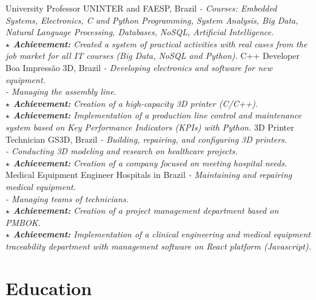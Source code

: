 \documentclass[letterpaper]{twentysecondcv_en} %
\begin{document}
\begin{twenty} %
						{University Professor}
						{UNINTER and FAESP, Brazil}
						{\emph{- Courses: Embedded Systems, Electronics, C and Python 
						Programming, System Analysis, Big Data, 
						Natural Language Processing, Databases, NoSQL, Artificial 
						Intelligence.\\
						\textbf{$\star$ Achievement:} Created a system of practical 
						activities with real cases from the job market for all IT courses
						(Big Data, NoSQL and Python).}}
						{C++ Developer}
						{Boa Impressão 3D, Brazil}
						{\emph{- Developing electronics and software for new equipment.\\
						- Managing the assembly line.\\
						\textbf{$ \star $ Achievement:} Creation of a high-capacity 3D 
						printer (C/C++).\\
						\textbf{$ \star $ Achievement:} Implementation of a production line 
						control and maintenance system based on Key Performance Indicators 
						(KPIs) with Python.}}
						{3D Printer Technician}
						{GS3D, Brazil}
						{\emph{- Building, repairing, and configuring 3D printers.\\
						- Conducting 3D modeling and research on healthcare projects.\\
						\textbf{$ \star $ Achievement:} Creation of a company focused on 
						meeting hospital needs.}}
						{Medical Equipment Engineer}
						{Hospitals in Brazil}
						{\emph{- Maintaining and repairing medical equipment.\\
						- Managing teams of technicians.\\
						\textbf{$ \star $ Achievement:} Creation of a project management 
						department based on PMBOK.\\
						\textbf{$ \star $ Achievement:} Implementation of a clinical 
						engineering and medical equipment traceability department with 
						management software on React platform (Javascript).}}
\end{twenty}


\section{Education}
\end{document}
